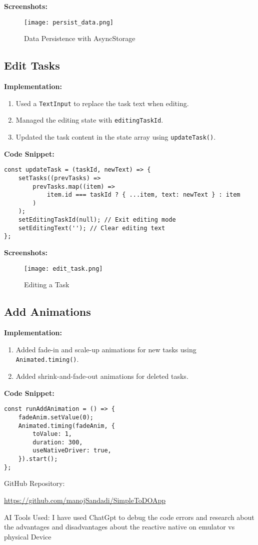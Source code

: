 \documentclass{article}
\begin{document}
\textbf{Screenshots:}
\begin{figure}[H]
    \centering
    \texttt{[image: persist\_data.png]}
    \caption{Data Persistence with AsyncStorage}
    \label{fig:persist-data}
\end{figure}

\subsection{Edit Tasks}


\textbf{Implementation:}
\begin{enumerate}
    \item Used a \texttt{TextInput} to replace the task text when editing.
    \item Managed the editing state with \texttt{editingTaskId}.
    \item Updated the task content in the state array using \texttt{updateTask()}.
\end{enumerate}

\textbf{Code Snippet:}
\begin{lstlisting}
const updateTask = (taskId, newText) => {
    setTasks((prevTasks) =>
        prevTasks.map((item) =>
            item.id === taskId ? { ...item, text: newText } : item
        )
    );
    setEditingTaskId(null); // Exit editing mode
    setEditingText(''); // Clear editing text
};
\end{lstlisting}

\textbf{Screenshots:}
\begin{figure}[H]
    \centering
    \texttt{[image: edit\_task.png]}
    \caption{Editing a Task}
    \label{fig:edit-task}
\end{figure}

\subsection{Add Animations}
\textbf{Implementation:}
\begin{enumerate}
    \item Added fade-in and scale-up animations for new tasks using \texttt{Animated.timing()}.
    \item Added shrink-and-fade-out animations for deleted tasks.
\end{enumerate}

\textbf{Code Snippet:}
\begin{lstlisting}
const runAddAnimation = () => {
    fadeAnim.setValue(0);
    Animated.timing(fadeAnim, {
        toValue: 1,
        duration: 300,
        useNativeDriver: true,
    }).start();
};
\end{lstlisting}
\vspace{0.3cm}
GitHub Repository:
\begin{link}
    \href{https://github.com/manojSandadi/SimpleToDOApp}{https://github.com/manojSandadi/SimpleToDOApp} \\ 
\end{link}
\vspace{0.3cm}
AI Tools Used: I have used ChatGpt to debug the code errors and research about the advantages and disadvantages about the reactive native on emulator vs physical Device
\end{document}

